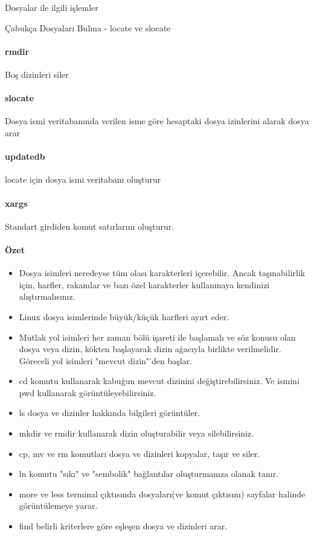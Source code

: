 \begin{section}{Dosyalar ile ilgili işlemler}
\begin{subsection}{Çabukça Dosyaları Bulma - locate ve slocate}
\paragraph{rmdir}{	Boş dizinleri siler}
\paragraph{slocate}{	Dosya ismi veritabanında verilen isme göre hesaptaki dosya izinlerini alarak dosya arar}
\paragraph{updatedb}{	locate için dosya ismi veritabanı oluşturur}
\paragraph{xargs}{	Standart girdiden komut satırlarını oluşturur.}

\paragraph{Özet}{
\begin{itemize}
 \item Dosya isimleri neredeyse tüm olası karakterleri içerebilir. Ancak taşınabilirlik için,  harfler, rakamlar ve bazı özel karakterler kullanmaya kendinizi alıştırmalısınız.
 \item Linux dosya isimlerinde büyük/küçük harfleri ayırt eder.
 \item Mutlak yol isimleri her zaman bölü işareti ile başlamalı ve söz konusu olan dosya veya dizin, kökten başlayarak dizin ağacıyla birlikte verilmelidir. Göreceli yol isimleri "mevcut dizin"'den başlar.
 \item cd komutu kullanarak kabuğun mevcut dizinini değiştirebilirsiniz. Ve ismini pwd kullanarak görüntüleyebilirsiniz.
 \item ls dosya ve dizinler hakkında bilgileri görüntüler.
 \item mkdir ve rmdir kullanarak dizin oluşturabilir veya silebilirsiniz.
 \item cp, mv ve rm komutları dosya ve dizinleri kopyalar, taşır ve siler.
 \item ln komutu "sıkı" ve "sembolik" bağlantılar oluşturmanıza olanak tanır.
 \item more ve less terminal çıktısında dosyaları(ve komut çıktısını) sayfalar halinde görüntülemeye yarar.
 \item find belirli kriterlere göre eşleşen dosya ve dizinleri arar.
\end{itemize}}
\end{subsection}
\end{section}